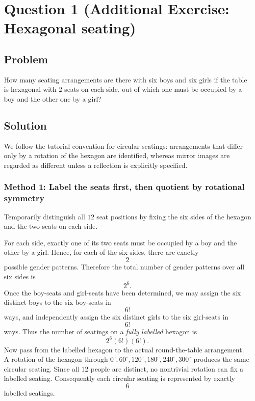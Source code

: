 \documentclass[12pt]{article}
\begin{document}
\section{Question 1 (Additional Exercise: Hexagonal seating)}
\subsection{Problem}
How many seating arrangements are there with six boys and six girls if the table is hexagonal with $2$ seats on each side, out of which one must be occupied by a boy and the other one by a girl?

\subsection{Solution}
We follow the tutorial convention for circular seatings: arrangements that differ only by a rotation of the hexagon are identified, whereas mirror images are regarded as different unless a reflection is explicitly specified.

\subsubsection{Method 1: Label the seats first, then quotient by rotational symmetry}
Temporarily distinguish all $12$ seat positions by fixing the six sides of the hexagon and the two seats on each side.

For each side, exactly one of its two seats must be occupied by a boy and the other by a girl. Hence, for each of the six sides, there are exactly
\[
2
\]
possible gender patterns. Therefore the total number of gender patterns over all six sides is
\[
2^6.
\]
Once the boy-seats and girl-seats have been determined, we may assign the six distinct boys to the six boy-seats in
\[
6!
\]
ways, and independently assign the six distinct girls to the six girl-seats in
\[
6!
\]
ways. Thus the number of seatings on a \emph{fully labelled} hexagon is
\[
2^6(6!)(6!).
\]
Now pass from the labelled hexagon to the actual round-the-table arrangement. A rotation of the hexagon through $0^\circ,60^\circ,120^\circ,180^\circ,240^\circ,300^\circ$ produces the same circular seating. Since all $12$ people are distinct, no nontrivial rotation can fix a labelled seating. Consequently each circular seating is represented by exactly
\[
6
\]
labelled seatings.
\end{document}
